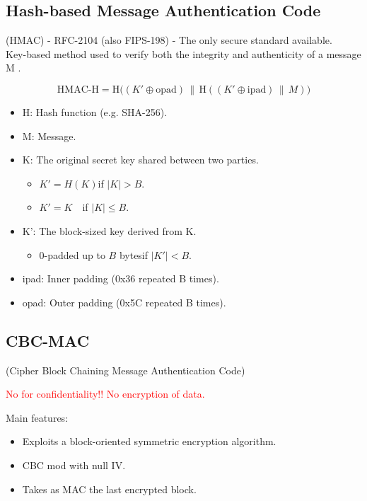 \subsection{Hash-based Message Authentication Code}
\begin{center}
    (HMAC) - RFC-2104 (also FIPS-198) - The only secure standard available.
    \\ Key-based method used to verify both the integrity and authenticity of a message  M .
\end{center}

\[
\text{HMAC-H} = \text{H}\big((K' \oplus \text{opad}) \, \| \, \text{H}((K' \oplus \text{ipad}) \, \| \, M)\big)
\]

\begin{itemize}
    \item H: Hash function (e.g. SHA-256).
    \item M: Message.
    \item K: The original secret key shared between two parties.
    \begin{itemize}
        \item $K' = H(K)$\quad if $|K| > B$.
        \item $K' = K$\quad\ \ \quad if $|K| \le B$.
    \end{itemize}
    \item K': The block-sized key derived from  K.
    \begin{itemize}
        \item 0-padded up to $B$ bytes\quad if $|K'| < B$.
    \end{itemize}
    \item ipad: Inner padding (0x36 repeated B times).
    \item opad: Outer padding (0x5C repeated B times).
\end{itemize}


\subsection{CBC-MAC}
\begin{center}
    (Cipher Block Chaining Message Authentication Code)
\end{center}
\textcolor{Red}{No for confidentiality!! No encryption of data.}

Main features:
\begin{itemize}
    \item Exploits a block-oriented symmetric encryption algorithm.
    \item CBC mod with null IV.
    \item Takes as MAC the last encrypted block.
\end{itemize}

